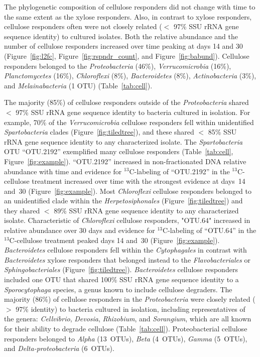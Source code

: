 The phylogenetic composition of cellulose responders did not change with time
to the same extent as the xylose responders. Also, in contrast to xylose
responders, cellulose responders often were not closely related ($<$ 97\% SSU
rRNA gene sequence identity) to cultured isolates. Both the relative abundance
and the number of cellulose responders increased over time peaking at days 14
and 30 (Figure~\ref{fig:l2fc}, Figure~\ref{fig:rspndr_count}, and Figure~\ref{fig:babund}).
Cellulose responders belonged to the \textit{Proteobacteria} (46\%),
\textit{Verrucomicrobia} (16\%), \textit{Planctomycetes} (16\%),
\textit{Chloroflexi} (8\%), \textit{Bacteroidetes} (8\%),
\textit{Actinobacteria} (3\%), and \textit{Melainabacteria} (1 OTU)
(Table~\ref{tab:cell}). 

The majority (85\%) of cellulose responders outside of the
\textit{Proteobacteria} shared  $<$ 97\% SSU rRNA gene sequence identity to
bacteria cultured in isolation. For example, 70\% of the
\textit{Verrucomicrobia} cellulose responders fell within unidentified
\textit{Spartobacteria} clades (Figure~\ref{fig:tiledtree}), and these shared $<$
85\% SSU rRNA gene sequence identity to any characterized isolate. The
\textit{Spartobacteria} OTU ``OTU.2192'' exemplified many cellulose responders
(Table~\ref{tab:cell}, Figure~\ref{fig:example}).
``OTU.2192'' increased in non-fractionated DNA relative abundance with time and
evidence for $^{13}$C-labeling of ``OTU.2192'' in the $^{13}$C-cellulose
treatment increased over time with the strongest evidence at days~14
and~30 (Figure~\ref{fig:example}). Most \textit{Chloroflexi} cellulose
responders belonged to an unidentified clade within the
\textit{Herpetosiphonales} (Figure~\ref{fig:tiledtree}) and they shared
$<$ 89\% SSU rRNA gene sequence identity to any characterized isolate.
Characteristic of \textit{Chloroflexi} cellulose responders, "OTU.64"
increased in relative abundance over 30 days and evidence for
$^{13}$C-labeling of ``OTU.64'' in the $^{13}$C-cellulose treatment peaked
days 14 and~30 (Figure~\ref{fig:example}). \textit{Bacteroidetes}
cellulose responders fell within
the \textit{Cytophagales} in contrast with \textit{Bacteroidetes} xylose
responders that belonged instead to the \textit{Flavobacteriales} or
\textit{Sphingobacteriales} (Figure~\ref{fig:tiledtree}).
\textit{Bacteroidetes} cellulose responders included one OTU that shared
100\% SSU rRNA gene sequence identity to a \textit{Sporocytophaga}
species, a genus known to include cellulose degraders. The majority (86\%)
of cellulose responders in the \textit{Proteobacteria} were closely
related ($>$ 97\% identity) to bacteria cultured in isolation, including
representatives of the genera: \textit{Cellvibrio}, \textit{Devosia},
\textit{Rhizobium}, and \textit{Sorangium}, which are all known for their
ability to degrade cellulose (Table~\ref{tab:cell}). Proteobacterial
cellulose responders belonged to \textit{Alpha} (13~OTUs), \textit{Beta}
(4~OTUs), \textit{Gamma} (5~OTUs), and \textit{Delta-proteobacteria}
(6~OTUs).

